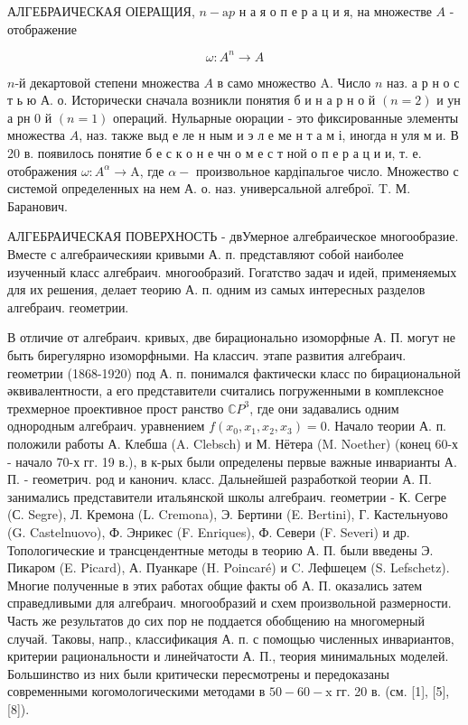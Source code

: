\documentclass[10pt]{article}
\begin{document}
АЛГЕБРАИЧЕСКАЯ ОІЕРАЩИЯ, $n-\mathrm{a} p$ н а я о п е р а ц и я, на множестве $A$ - отображение



\[

\omega: A^{n} \longrightarrow A

\]



$n$-й декартовой степени множества $A$ в само множество A. Число $n$ наз. а р н о с т ь ю А. о. Исторически сначала возникли понятия б и н а р н о й $(n=2)$ и ун а рн 0 й $(n=1)$ операций. Нульарные оюрации - это фиксированные элементы множества $A$, наз. также выд е ле н ным и э л е ме н т а м і, иногда н уля м и. В 20 в. появилось понятие б е с к о н е чн $о$ м е с т ной о п е р а ц и и, т. е. отображения $\omega: A^{\alpha} \rightarrow \mathrm{A}$, где $\alpha-$ произвольное кардіпальгое число. Множество с системой определенных на нем А. о. наз. универсальной алгеброї. T. М. Баранович.



АЛГЕБРАИЧЕСКАЯ ПОВЕРХНОСТЬ - двУмерное алгебраическое многообразие. Вместе с алгебраическияи кривыми А. п. представляют собой наиболее изученный класс алгебраич. многообразий. Гогатство задач и идей, применяемых для их решения, делает теорию А. п. одним из самых интересных разделов алгебраич. геометрии.



В отличие от алгебраич. кривых, две бирационально изоморфные А. П. могут не быть бирегулярно изоморфными. На классич. этапе развития алгебраич. геометрии (1868-1920) под А. п. понимался фактически класс по бирациональной әквивалентности, а его представители считались погруженными в комплексное трехмерное проективное прост ранство $\mathbb{C} P^{3}$, где они задавались одним однородным алгебраич. уравнением $f\left(x_{0}, x_{1}, x_{2}, x_{3}\right)=0$. Начало теории А. п. положили работы А. Клебша (A. Clebsch) и М. Нётера (M. Noether) (конец 60-х - начало 70-х гг. 19 в.), в к-рых были определены первые важные инварианты А. П. - геометрич. род и канонич. класс. Дальнейшей разработкой теории А. П. занимались представители итальянской школы алгебраич. геометрии - К. Сегре (С. Segre), Л. Кремона (L. Cremona), Э. Бертини (E. Bertini), Г. Кастельнуово (G. Castelnuovo), Ф. Энрикес (F. Enriques), Ф. Севери (F. Severi) и др. Топологические и трансцендентные методы в теорию А. П. были введены Э. Пикаром (E. Picard), А. Пуанкаре (H. Poincaré) и C. Лефшецем (S. Lefschetz). Многие полученные в этих работах общие факты об А. П. оказались затем справедливыми для алгебраич. многообразий и схем произвольной размерности. Часть же результатов до сих пор не поддается обобщению на многомерный случай. Таковы, напр., классификация А. п. с помощью численных инвариантов, критерии рациональности и линейчатости А. П., теория минимальных моделей. Большинство из них были критически пересмотрены и передоказаны современными когомологическими методами в $50-60-\mathrm{x}$ гг. 20 в. (см. [1], [5], [8]).
\end{document}
